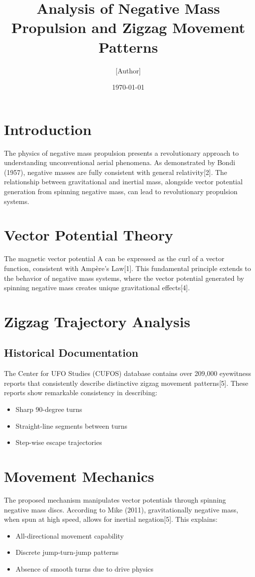 \documentclass[12pt]{article}
\title{Analysis of Negative Mass Propulsion and Zigzag Movement Patterns}
\author{[Author]}
\date{\today}
\begin{document}
\maketitle

\section{Introduction}
The physics of negative mass propulsion presents a revolutionary approach to understanding unconventional aerial phenomena. As demonstrated by Bondi (1957), negative masses are fully consistent with general relativity[2]. The relationship between gravitational and inertial mass, alongside vector potential generation from spinning negative mass, can lead to revolutionary propulsion systems.

\section{Vector Potential Theory}
The magnetic vector potential A can be expressed as the curl of a vector function, consistent with Ampère's Law[1]. This fundamental principle extends to the behavior of negative mass systems, where the vector potential generated by spinning negative mass creates unique gravitational effects[4].

\section{Zigzag Trajectory Analysis}
\subsection{Historical Documentation}
The Center for UFO Studies (CUFOS) database contains over 209,000 eyewitness reports that consistently describe distinctive zigzag movement patterns[5]. These reports show remarkable consistency in describing:
\begin{itemize}
    \item Sharp 90-degree turns
    \item Straight-line segments between turns
    \item Step-wise escape trajectories
\end{itemize}

\section{Movement Mechanics}
The proposed mechanism manipulates vector potentials through spinning negative mass discs. According to Mike (2011), gravitationally negative mass, when spun at high speed, allows for inertial negation[5]. This explains:
\begin{itemize}
    \item All-directional movement capability
    \item Discrete jump-turn-jump patterns
    \item Absence of smooth turns due to drive physics
\end{itemize}
\end{document}
